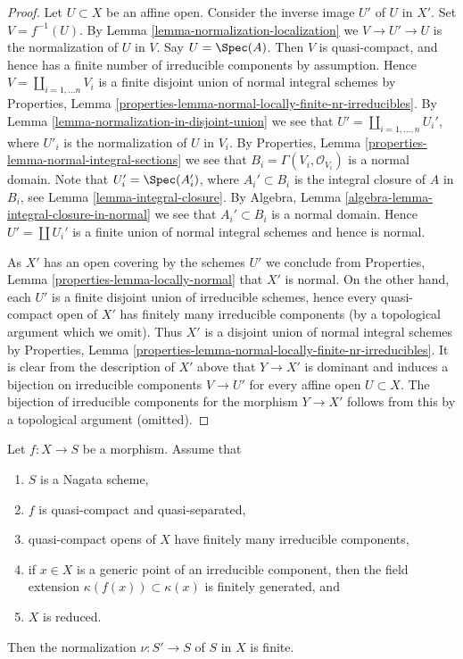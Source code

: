 \begin{proof}
Let $U \subset X$ be an affine open. Consider the
inverse image $U'$ of $U$ in $X'$.
Set $V = f^{-1}(U)$. By Lemma \ref{lemma-normalization-localization}
we $V \to U' \to U$ is the normalization of $U$ in $V$. Say
$U = \Spec(A)$. Then $V$ is quasi-compact, and hence has a finite number of
irreducible components by assumption. Hence
$V = \coprod_{i = 1, \ldots n} V_i$ is a finite disjoint union of
normal integral schemes by
Properties, Lemma \ref{properties-lemma-normal-locally-finite-nr-irreducibles}.
By Lemma \ref{lemma-normalization-in-disjoint-union}
we see that $U' = \coprod_{i = 1, \ldots, n} U_i'$,
where $U'_i$ is the normalization of $U$ in $V_i$.
By Properties, Lemma \ref{properties-lemma-normal-integral-sections}
we see that $B_i = \Gamma(V_i, \mathcal{O}_{V_i})$ is a normal domain.
Note that $U_i' = \Spec(A_i')$, where $A_i' \subset B_i$
is the integral closure of $A$ in $B_i$, see
Lemma \ref{lemma-integral-closure}. By
Algebra, Lemma \ref{algebra-lemma-integral-closure-in-normal}
we see that $A_i' \subset B_i$ is a normal domain.
Hence $U' = \coprod U_i'$ is a finite union of normal integral schemes
and hence is normal.

\medskip\noindent
As $X'$ has an open covering by the schemes $U'$ we conclude from
Properties, Lemma \ref{properties-lemma-locally-normal} that $X'$ is normal.
On the other hand, each $U'$ is a finite disjoint union of irreducible
schemes, hence every quasi-compact open of $X'$ has finitely many irreducible
components (by a topological argument which we omit). Thus $X'$
is a disjoint union of normal integral schemes by
Properties, Lemma \ref{properties-lemma-normal-locally-finite-nr-irreducibles}.
It is clear from the description of $X'$ above that $Y \to X'$
is dominant and induces a bijection on irreducible components
$V \to U'$ for every affine open $U \subset X$. The bijection of
irreducible components for the morphism $Y \to X'$
follows from this by a topological argument (omitted).
\end{proof}

\begin{lemma}
\label{lemma-nagata-normalization-finite-general}
Let $f : X \to S$ be a morphism. Assume that
\begin{enumerate}
\item $S$ is a Nagata scheme,
\item $f$ is quasi-compact and quasi-separated,
\item quasi-compact opens of $X$ have finitely many irreducible components,
\item if $x \in X$ is a generic point of an irreducible component,
then the field extension $\kappa(f(x)) \subset \kappa(x)$ is finitely
generated, and
\item $X$ is reduced.
\end{enumerate}
Then the normalization $\nu : S' \to S$ of $S$ in $X$ is finite.
\end{lemma}

